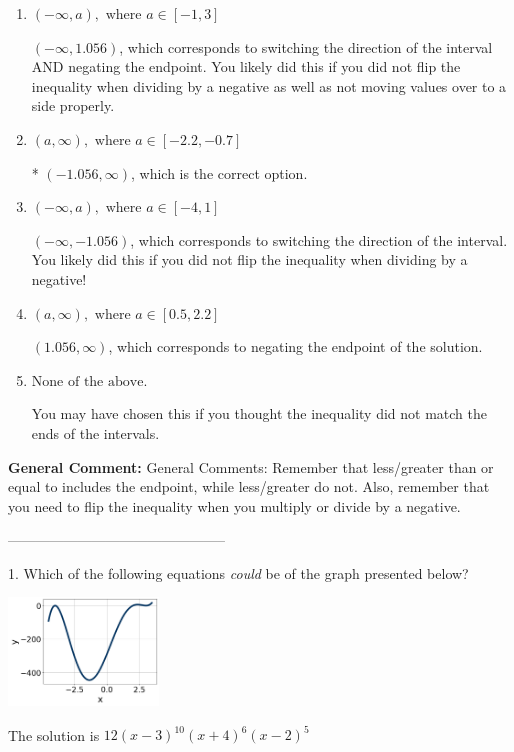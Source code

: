 \documentclass{extbook}[14pt]
\begin{document}
\begin{enumerate}[label=\Alph*.] 
\item $ (-\infty, a), \text{ where } a \in [-1, 3] $ 

  $(-\infty, 1.056)$, which corresponds to switching the direction of the interval AND negating the endpoint. You likely did this if you did not flip the inequality when dividing by a negative as well as not moving values over to a side properly. 
\item $ (a, \infty), \text{ where } a \in [-2.2, -0.7] $ 

 * $(-1.056, \infty)$, which is the correct option. 
\item $ (-\infty, a), \text{ where } a \in [-4, 1] $ 

  $(-\infty, -1.056)$, which corresponds to switching the direction of the interval. You likely did this if you did not flip the inequality when dividing by a negative! 
\item $ (a, \infty), \text{ where } a \in [0.5, 2.2] $ 

  $(1.056, \infty)$, which corresponds to negating the endpoint of the solution. 
\item $ \text{None of the above}. $ 

 You may have chosen this if you thought the inequality did not match the ends of the intervals. 
\end{enumerate} 
 
\textbf{General Comment:} General Comments: Remember that less/greater than or equal to includes the endpoint, while less/greater do not. Also, remember that you need to flip the inequality when you multiply or divide by a negative. 

-----------------------------------------------

1. Which of the following equations \textit{could} be of the graph presented below?
\begin{center} \includegraphics[width=0.3\textwidth]{../Figures/polyGraphToFunctionB.png} \end{center} 

The solution is $ 12(x - 3)^{10} (x + 4)^{6} (x - 2)^{5} $ 
\end{document}
